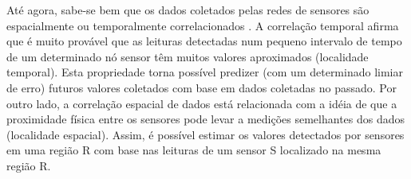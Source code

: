 \documentclass{acm_proc_article-sp}
\begin{document}
Até agora, sabe-se bem que os dados coletados pelas redes de sensores são
espacialmente ou temporalmente correlacionados \cite {Chu2006, Villas2012,
Yoon2005}. A correlação temporal afirma que é muito provável que as leituras
detectadas num pequeno intervalo de tempo de um determinado nó sensor têm muitos
valores aproximados (localidade temporal). Esta propriedade torna possível
predizer (com um determinado limiar de erro) futuros valores coletados com base
em dados coletadas no passado. Por outro lado, a correlação espacial de dados
está relacionada com a idéia de que a proximidade física entre os sensores pode
levar a medições semelhantes dos dados (localidade espacial).
Assim, é possível estimar os valores detectados por sensores em uma região R com
base nas leituras de um sensor S localizado na mesma região R.
\vspace*{-.3cm}
\end{document}
